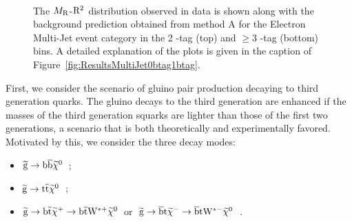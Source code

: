 \begin{figure}[!htb] \centering
{}\\
\caption{ The $M_\mathrm{R}$-$\mathrm{R}^2$ distribution observed in data is shown along with the background prediction
obtained from method A for the Electron Multi-Jet event category in the 2 \PQb-tag (top) and $\geq 3$ \PQb-tag (bottom) bins. 
A detailed explanation of the plots is given in the caption of Figure~\ref{fig:ResultsMultiJet0btag1btag}.
}
\label{fig:ResultsEleMultiJet2btag3btag}
\end{figure}

\clearpage

First, we consider the scenario of gluino pair production
decaying to third generation quarks. The gluino decays to the third generation
are enhanced if the masses of the third generation squarks are
lighter than those of the first two generations, a scenario that is both theoretically and 
experimentally favored. Motivated by this, we consider the three decay
modes:
\begin{itemize}
\item $\mathrm{\widetilde{g}}\rightarrow\mathrm{b}\overline{\mathrm{b}}\widetilde{\chi}^0$~;
\item $\mathrm{\widetilde{g}}\rightarrow\mathrm{t}\overline{\mathrm{t}}\widetilde{\chi}^0$~; 
\item $\mathrm{\widetilde{g}}\rightarrow\mathrm{b}\overline{\mathrm{t}}\widetilde{\chi}^{+}\rightarrow\mathrm{b}\overline{\mathrm{t}} \mathrm{W}^{\ast
    +}\widetilde{\chi}^0$~or~$\mathrm{\widetilde{g}}\rightarrow\overline{\mathrm{b}}\mathrm{t}\widetilde{\chi}^{-}\rightarrow\overline{\mathrm{b}}\mathrm{t} \mathrm{W}^{\ast
    -}\widetilde{\chi}^0$~.
\end{itemize}

